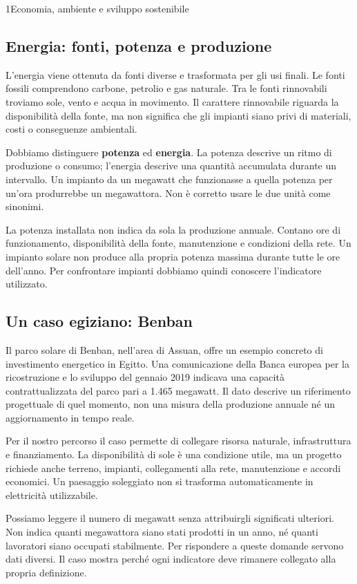 \begin{lettura}{1}{Economia, ambiente e sviluppo sostenibile}
\subsection*{Energia: fonti, potenza e produzione}
L'energia viene ottenuta da fonti diverse e trasformata per gli usi finali. Le fonti fossili comprendono carbone, petrolio e gas naturale. Tra le fonti rinnovabili troviamo sole, vento e acqua in movimento. Il carattere rinnovabile riguarda la disponibilità della fonte, ma non significa che gli impianti siano privi di materiali, costi o conseguenze ambientali.

Dobbiamo distinguere \textbf{potenza} ed \textbf{energia}. La potenza descrive un ritmo di produzione o consumo; l'energia descrive una quantità accumulata durante un intervallo. Un impianto da un megawatt che funzionasse a quella potenza per un'ora produrrebbe un megawattora. Non è corretto usare le due unità come sinonimi.

La potenza installata non indica da sola la produzione annuale. Contano ore di funzionamento, disponibilità della fonte, manutenzione e condizioni della rete. Un impianto solare non produce alla propria potenza massima durante tutte le ore dell'anno. Per confrontare impianti dobbiamo quindi conoscere l'indicatore utilizzato.

\subsection*{Un caso egiziano: Benban}
Il parco solare di Benban, nell'area di Assuan, offre un esempio concreto di investimento energetico in Egitto. Una comunicazione della Banca europea per la ricostruzione e lo sviluppo del gennaio 2019 indicava una capacità contrattualizzata del parco pari a 1.465 megawatt. Il dato descrive un riferimento progettuale di quel momento, non una misura della produzione annuale né un aggiornamento in tempo reale.

Per il nostro percorso il caso permette di collegare risorsa naturale, infrastruttura e finanziamento. La disponibilità di sole è una condizione utile, ma un progetto richiede anche terreno, impianti, collegamenti alla rete, manutenzione e accordi economici. Un paesaggio soleggiato non si trasforma automaticamente in elettricità utilizzabile.

Possiamo leggere il numero di megawatt senza attribuirgli significati ulteriori. Non indica quanti megawattora siano stati prodotti in un anno, né quanti lavoratori siano occupati stabilmente. Per rispondere a queste domande servono dati diversi. Il caso mostra perché ogni indicatore deve rimanere collegato alla propria definizione.


\end{lettura}
